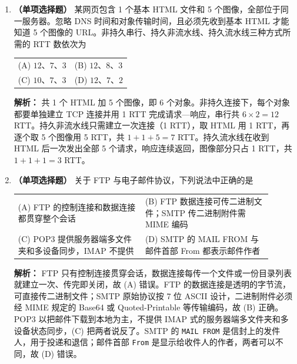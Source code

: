 \begin{enumerate}

\item \textbf{（单项选择题）} 某网页包含 1 个基本 HTML 文件和 5 个图像，全部位于同一服务器。忽略 DNS 时间和对象传输时间，且必须先收到基本 HTML 才能知道 5 个图像的 URL。非持久串行、持久非流水线、持久流水线三种方式所需的 RTT 数依次为
\begin{center}
\begin{tabular}{ll}
(A) $12$、$7$、$3$ & (B) $12$、$8$、$3$ \\[6pt]
(C) $10$、$7$、$3$ & (D) $12$、$7$、$2$
\end{tabular}
\end{center}

\ifshowsolutions\par\noindent\textbf{解析：} 共 1 个 HTML 加 5 个图像，即 6 个对象。非持久连接下，每个对象都要单独建立 TCP 连接并用 1 RTT 完成请求—响应，串行共 $6\times 2=12$ RTT。持久非流水线只需建立一次连接（1 RTT），取 HTML 用 1 RTT，再逐个取 5 个图像用 5 RTT，共 $1+1+5=7$ RTT。持久流水线在收到 HTML 后一次发出全部 5 个请求，响应连续返回，图像部分只占 1 RTT，共 $1+1+1=3$ RTT。\else \answerarea \fi

\item \textbf{（单项选择题）} 关于 FTP 与电子邮件协议，下列说法中正确的是
\begin{center}
\begin{tabular}{>{\raggedright\arraybackslash}p{0.45\linewidth}>{\raggedright\arraybackslash}p{0.45\linewidth}}
(A) FTP 的控制连接和数据连接都贯穿整个会话 &
(B) FTP 数据连接可传二进制文件；SMTP 传二进制附件需 MIME 编码 \\[6pt]
(C) POP3 提供服务器端多文件夹和多设备同步，IMAP 不提供 &
(D) SMTP 的 MAIL FROM 与邮件首部 From 都表示邮件作者
\end{tabular}
\end{center}

\ifshowsolutions\par\noindent\textbf{解析：} FTP 只有控制连接贯穿会话，数据连接每传一个文件或一份目录列表就建立一次、传完即关闭，故 (A) 错误。FTP 的数据连接是透明的字节流，可直接传二进制文件；SMTP 原始协议按 7 位 ASCII 设计，二进制附件必须经 MIME 规定的 Base64 或 Quoted-Printable 等传输编码，故 (B) 正确。POP3 以把邮件下载到本地为主，不提供 IMAP 式的服务器端多文件夹和多设备状态同步，(C) 把两者说反了。SMTP 的 \texttt{MAIL FROM} 是信封上的发件人，用于投递和退信；邮件首部 \texttt{From} 是显示给收件人的作者，两者可以不同，故 (D) 错误。\else \answerarea \fi


\end{enumerate}
